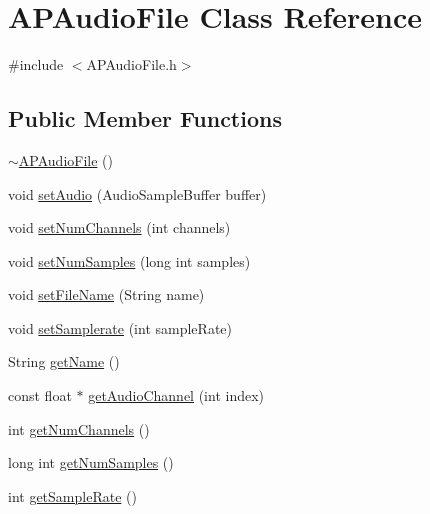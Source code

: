 \hypertarget{class_a_p_audio_file}{\section{A\+P\+Audio\+File Class Reference}
\label{class_a_p_audio_file}
}


{\ttfamily \#include $<$A\+P\+Audio\+File.\+h$>$}

\subsection*{Public Member Functions}
\begin{DoxyCompactItemize}
\item 
\hyperlink{class_a_p_audio_file_a1139a3105847950da22822fd9518a3b9}{$\sim$\+A\+P\+Audio\+File} ()
\item 
void \hyperlink{class_a_p_audio_file_a07d1b051ca1b498187bbf5a5d9439af3}{set\+Audio} (Audio\+Sample\+Buffer buffer)
\item 
void \hyperlink{class_a_p_audio_file_a453184afd4e48694e0bed36459fb7641}{set\+Num\+Channels} (int channels)
\item 
void \hyperlink{class_a_p_audio_file_abce32907787e6fb546861e9085aba9e2}{set\+Num\+Samples} (long int samples)
\item 
void \hyperlink{class_a_p_audio_file_a02940af3dd917491796347acd197aa30}{set\+File\+Name} (String name)
\item 
void \hyperlink{class_a_p_audio_file_a396c24cbfbe2b65db24d1f62e324202b}{set\+Samplerate} (int sample\+Rate)
\item 
String \hyperlink{class_a_p_audio_file_acb1dceb8d5ab6d5cf37f9fc880bcfbba}{get\+Name} ()
\item 
const float $\ast$ \hyperlink{class_a_p_audio_file_a648534146533efbab0f23138f9b9bd3c}{get\+Audio\+Channel} (int index)
\item 
int \hyperlink{class_a_p_audio_file_a6e81aaf02553821367017388f08ea603}{get\+Num\+Channels} ()
\item 
long int \hyperlink{class_a_p_audio_file_a7b29d23f6b306c75be3cda81c3f7b470}{get\+Num\+Samples} ()
\item 
int \hyperlink{class_a_p_audio_file_a14b346948198b6f99806e5e30c1a5839}{get\+Sample\+Rate} ()
\end{DoxyCompactItemize}


